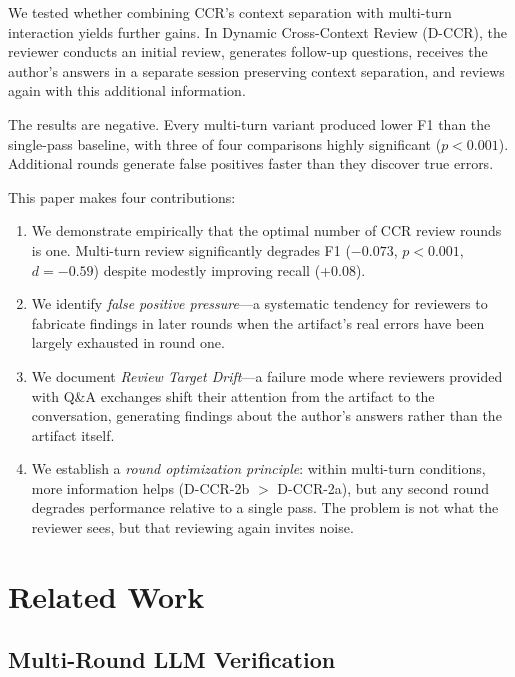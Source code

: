 \documentclass[11pt]{article}
\begin{document}
We tested whether combining CCR's context separation with multi-turn interaction yields further gains.
In Dynamic Cross-Context Review (D-CCR), the reviewer conducts an initial review, generates follow-up questions, receives the author's answers in a separate session preserving context separation, and reviews again with this additional information.

The results are negative.
Every multi-turn variant produced lower F1 than the single-pass baseline, with three of four comparisons highly significant ($p < 0.001$).
Additional rounds generate false positives faster than they discover true errors.

This paper makes four contributions:

\begin{enumerate}
\item We demonstrate empirically that the optimal number of CCR review rounds is one.
Multi-turn review significantly degrades F1 ($-0.073$, $p < 0.001$, $d = -0.59$) despite modestly improving recall (+0.08).

\item We identify \emph{false positive pressure}---a systematic tendency for reviewers to fabricate findings in later rounds when the artifact's real errors have been largely exhausted in round one.

\item We document \emph{Review Target Drift}---a failure mode where reviewers provided with Q\&A exchanges shift their attention from the artifact to the conversation, generating findings about the author's answers rather than the artifact itself.

\item We establish a \emph{round optimization principle}: within multi-turn conditions, more information helps (D-CCR-2b $>$ D-CCR-2a), but any second round degrades performance relative to a single pass.
The problem is not what the reviewer sees, but that reviewing again invites noise.
\end{enumerate}

\section{Related Work}

\subsection{Multi-Round LLM Verification}
\end{document}
